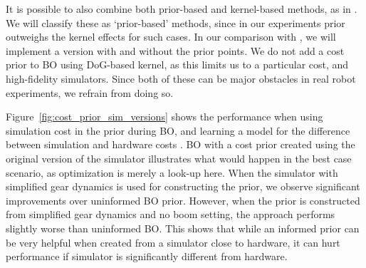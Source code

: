 It is possible to also combine both prior-based and kernel-based methods, as in \cite{cully2015robots}. We will classify these as `prior-based' methods, since in our experiments prior outweighs the kernel effects for such cases. In our comparison with \cite{cully2015robots}, we will implement a version with and without the prior points. We do not add a cost prior to BO using DoG-based kernel, as this limits us to a particular cost, and high-fidelity simulators. Since both of these can be major obstacles in real robot experiments, we refrain from doing so.


Figure~\ref{fig:cost_prior_sim_versions} shows the performance when using simulation cost in the prior during BO, and learning a model for the difference between simulation and hardware costs \citep{wilson2014using}. BO with a cost prior created using the original version of the simulator illustrates what would happen in the best case scenario, as optimization is merely a look-up here. When the simulator with simplified gear dynamics is used for constructing the prior, we observe significant improvements over uninformed BO prior. However, when the prior is constructed from simplified gear dynamics and no boom setting, the approach performs slightly worse than uninformed BO. This shows that while an informed prior can be very helpful when created from a simulator close to hardware, it can hurt performance if simulator is significantly different from hardware. 


